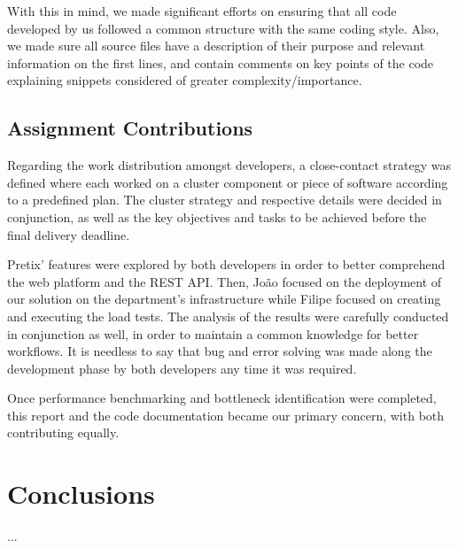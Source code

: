 \documentclass[12pt]{article}
\begin{document}
With this in mind, we made significant efforts on ensuring that all code developed by us followed a common structure with the same coding style.
Also, we made sure all source files have a description of their purpose and relevant information on the first lines, and contain comments on key points of the 
code explaining snippets considered of greater complexity/importance.

\subsection{Assignment Contributions} \label{remarks.contributions} %


Regarding the work distribution amongst developers, a close-contact strategy was defined where each worked on a cluster component or piece of software according 
to a predefined plan. 
The cluster strategy and respective details were decided in conjunction, as well as the key objectives and tasks to be achieved before the final delivery deadline.

Pretix' features were explored by both developers in order to better comprehend the web platform and the REST API.
Then, João focused on the deployment of our solution on the department's infrastructure while Filipe focused on creating and executing the load tests.
The analysis of the results were carefully conducted in conjunction as well, in order to maintain a common knowledge for better workflows.
It is needless to say that bug and error solving was made along the development phase by both developers any time it was required.

Once performance benchmarking and bottleneck identification were completed, this report and the code documentation became our primary concern, with both 
contributing equally.

\newpage
\section*{Conclusions} \label{conclusions} %

...
\end{document}
